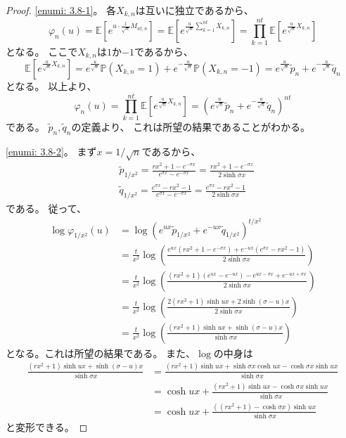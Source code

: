 \documentclass[uplatex]{jsarticle}
\theoremstyle{definition}
\def\P{\mathbb{P}}
\def\E{\mathbb{E}}
\begin{document}
\begin{proof}
  \ref{enumi: 3.8-1}。
  各\(X_{k,n}\)は互いに独立であるから、
  \[
  \varphi_n(u) = \E\left[ e^{u\cdot \frac{1}{\sqrt{n}}M_{nt,n}}\right]
  = \E\left[ e^{\frac{u}{\sqrt{n}}\sum_{k=1}^{nt}X_{k,n}}\right]
  = \prod_{k=1}^{nt}\E\left[ e^{\frac{u}{\sqrt{n}}X_{k,n}}\right]
  \]
  となる。
  ここで\(X_{k,n}\)は\(1\)か\(-1\)であるから、
  \[
  \E\left[ e^{\frac{u}{\sqrt{n}}X_{k,n}}\right]
  = e^{\frac{u}{\sqrt{n}}}\P(X_{k,n}=1)
  + e^{-\frac{u}{\sqrt{n}}}\P(X_{k,n}=-1)
  = e^{\frac{u}{\sqrt{n}}}\tilde{p}_n
  + e^{-\frac{u}{\sqrt{n}}}\tilde{q}_n
  \]
  となる。
  以上より、
  \[
  \varphi_n(u)
  = \prod_{k=1}^{nt}\E\left[ e^{\frac{u}{\sqrt{n}}X_{k,n}}\right]
  = \left(e^{\frac{u}{\sqrt{n}}}\tilde{p}_n
  + e^{-\frac{u}{\sqrt{n}}}\tilde{q}_n \right)^{nt}
  \]
  である。
  \(\tilde{p}_n, \tilde{q}_n\)の定義より、
  これは所望の結果であることがわかる。

  \ref{enumi: 3.8-2}。
  まず\(x=1/\sqrt{n}\)であるから、
  \begin{align*}
    &\tilde{p}_{1/x^2}
    = \frac{rx^2+1-e^{-\sigma x}}{e^{\sigma x}-e^{-\sigma x}}
    = \frac{rx^2+1-e^{-\sigma x}}{2\sinh \sigma x} \\
    &\tilde{q}_{1/x^2}
    = \frac{e^{\sigma x}-rx^2-1}{e^{\sigma x}-e^{-\sigma x}}
    = \frac{e^{\sigma x}-rx^2-1}{2\sinh \sigma x}
  \end{align*}
  である。
  従って、
  \begin{align*}
    \log \varphi_{1/x^2}(u)
    &= \log \left(e^{ux}\tilde{p}_{1/x^2}
    + e^{-ux}\tilde{q}_{1/x^2} \right)^{t/x^2} \\
    &= \frac{t}{x^2}\log \left(
    \frac{
    e^{ux}(rx^2+1-e^{-\sigma x}) + e^{-ux}(e^{\sigma x}-rx^2-1)
    }{2\sinh \sigma x}
    \right) \\
    &= \frac{t}{x^2}\log \left(
    \frac{
    (rx^2+1)(e^{ux}-e^{-ux})
    - e^{ux-\sigma x} + e^{-ux + \sigma x}
    }{2\sinh \sigma x}
    \right) \\
    &= \frac{t}{x^2}\log \left(
    \frac{
    2(rx^2+1)\sinh ux + 2\sinh (\sigma -u)x
    }{2\sinh \sigma x}
    \right) \\
    &= \frac{t}{x^2}\log \left(
    \frac{(rx^2+1)\sinh ux + \sinh (\sigma -u)x}{\sinh \sigma x}\right)
  \end{align*}
  となる。これは所望の結果である。
  また、\(\log\)の中身は
  \begin{align*}
    \frac{(rx^2+1)\sinh ux + \sinh (\sigma -u)x}{\sinh \sigma x}
    &= \frac{
    (rx^2+1)\sinh ux + \sinh \sigma x \cosh ux - \cosh \sigma x \sinh ux
    }{\sinh \sigma x} \\
    &= \cosh ux + \frac{
    (rx^2+1)\sinh ux - \cosh \sigma x \sinh ux
    }{\sinh \sigma x} \\
    &= \cosh ux + \frac{
    ((rx^2+1)- \cosh \sigma x )\sinh ux
    }{\sinh \sigma x}
  \end{align*}
  と変形できる。


\end{proof}
\end{document}
